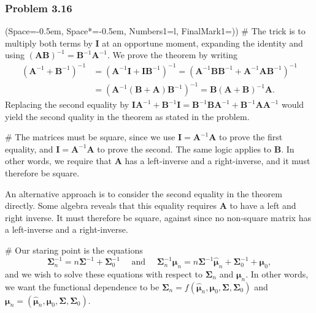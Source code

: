 \documentclass[12pt, a4paper]{article}
\newcommand{\listSpace}{-0.5em}%
\newcommand{\vect}[1]{\bm{#1}}
\begin{document}
\subsubsection*{Problem 3.16}
\begin{easylist}[enumerate]
	\ListProperties(Space=\listSpace, Space*=\listSpace, Numbers1=l, FinalMark1={)})
	# The trick is to multiply both terms by $\vect{I}$ at an opportune moment, expanding the identity and using $\left(\vect{A} \vect{B}\right)^{-1} = \vect{B}^{-1} \vect{A}^{-1}$. 
	We prove the theorem by writing
	\begin{align*}
	\left( \vect{A}^{-1} + \vect{B}^{-1}\right)^{-1} &=
		\left( \vect{A}^{-1} \vect{I} + \vect{I}\vect{B}^{-1}\right)^{-1} =
		\left( \vect{A}^{-1} \vect{B} \vect{B}^{-1} + \vect{A}^{-1} \vect{A}\vect{B}^{-1}\right)^{-1} \\
		&=  \left( \vect{A}^{-1} \left( \vect{B} + \vect{A} \right) \vect{B}^{-1} \right)^{-1} = 
		 \vect{B}\left( \vect{A} + \vect{B} \right)^{-1} \vect{A}.
	\end{align*}
	Replacing the second equality by $\vect{I} \vect{A}^{-1}  + \vect{B}^{-1} \vect{I} = \vect{B}^{-1} \vect{B}  \vect{A}^{-1} + \vect{B}^{-1} \vect{A} \vect{A}^{-1}$ would yield the second quality in the theorem as stated in the problem.
	
	# The matrices must be square, since we use $\vect{I} = \vect{A}^{-1} \vect{A}$ to prove the first equality, and $\vect{I} = \vect{A}^{-1} \vect{A}$ to prove the second. The same logic applies to $\vect{B}$.
	In other words, we require that $\vect{A}$ has a left-inverse and a right-inverse, and it must therefore be square.
	
	An alternative approach is to consider the second equality in the theorem directly.
	Some algebra reveals that this equality requires $\vect{A}$ to have a left and right inverse.
	It must therefore be square, against since no non-square matrix has a left-inverse and a right-inverse.
	
	# Our staring point is the equations
	\begin{equation*}
		\vect{\Sigma}_n^{-1} = n \vect{\Sigma}^{-1} + \vect{\Sigma}_0^{-1}
		\quad \text{ and } \quad
		\vect{\Sigma}_n^{-1} \vect{\mu}_n 
		=n \vect{\Sigma}^{-1} \hat{\vect{\mu}}_n 
		+
		\vect{\Sigma}^{-1}_0 + \vect{\mu}_0,
	\end{equation*}
	and we wish to solve these equations with respect to $\vect{\Sigma}_n$ and $\vect{\mu}_n$. 
	In other words, we want the functional dependence to be 
	$\vect{\Sigma}_n = f \left( \hat{\vect{\mu}}_n, \vect{\mu}_0, \vect{\Sigma}, \vect{\Sigma}_0 \right)$
	and $\vect{\mu}_n = \left( \hat{\vect{\mu}}_n, \vect{\mu}_0, \vect{\Sigma}, \vect{\Sigma}_0 \right)$.
	

\end{easylist}
\end{document}
